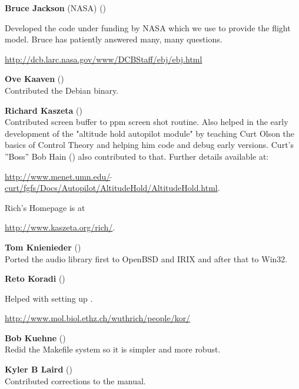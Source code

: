 \noindent \textbf{Bruce Jackson} (NASA)
()
 \medskip

   Developed the  code under funding by NASA which we use to provide the
   flight model. Bruce has patiently answered many, many questions.
 \medskip

  \href{http://dcb.larc.nasa.gov/www/DCBStaff/ebj/ebj.html}{http://dcb.larc.nasa.gov/www/DCBStaff/ebj/ebj.html}
  \medskip


\noindent \textbf{Ove Kaaven}  ()\\
 Contributed the Debian binary.
 \medskip

\noindent \textbf{Richard Kaszeta}  ()\\
  Contributed screen buffer to ppm screen shot routine.
  Also helped in the early development of the "altitude
  hold autopilot module" by teaching Curt Olson the basics of Control Theory
  and helping him code and debug early versions. Curt's ''Boss'' Bob Hain
 () also contributed to that.  Further details available at:
 \medskip

  \href{http://www.menet.umn.edu/~curt/fgfs/Docs/Autopilot/AltitudeHold/AltitudeHold.html}{http://www.menet.umn.edu/$\tilde{~~}$curt/fgfs/Docs/Autopilot/AltitudeHold/AltitudeHold.html}.
  \medskip

\noindent
  Rich's Homepage is at
  \medskip

  \href{http://www.kaszeta.org/rich/}{http://www.kaszeta.org/rich/}.
  \medskip

\noindent \textbf{Tom Knienieder} ()\\
  Ported the audio library first to OpenBSD and IRIX and after that to Win32.
 \medskip

\noindent \textbf{Reto Koradi} ()
 \medskip

  Helped with setting up .
 \medskip

\href{http://www.mol.biol.ethz.ch/wuthrich/people/kor/}{http://www.mol.biol.ethz.ch/wuthrich/people/kor/}
 \medskip

\noindent \textbf{Bob Kuehne} ()\\
  Redid the Makefile system so it is simpler and more robust.
 \medskip

\noindent \textbf{Kyler B Laird} ()\\
 Contributed corrections to the manual.
 \medskip

